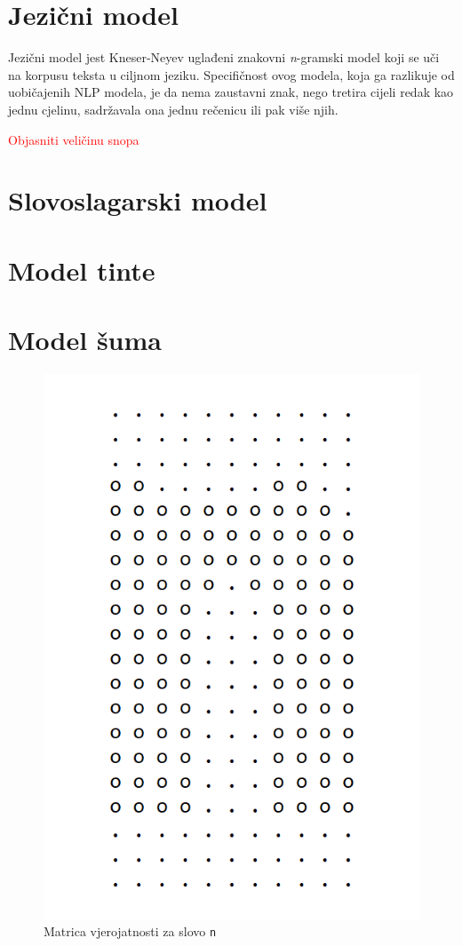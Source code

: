 \documentclass[zavrsnirad]{fer}
\begin{document}
\section{Jezični model}

Jezični model jest Kneser-Neyev uglađeni znakovni \textit{n}-gramski model \cite{Kneser1995} koji se uči na korpusu teksta u ciljnom jeziku. Specifičnost ovog modela, koja ga razlikuje od uobičajenih NLP modela, je da nema zaustavni znak, nego tretira cijeli redak kao jednu cjelinu, sadržavala ona jednu rečenicu ili pak više njih.

\textcolor{red}{Objasniti veličinu snopa} \cite{Berg2014}


\section{Slovoslagarski model}



\section{Model tinte}



\section{Model šuma}



\begin{figure}[hbt]
	\centering
	\includegraphics[width=0.35\linewidth]{Figures/letter-matrix.png} 
	\caption{Matrica vjerojatnosti za slovo \texttt{n}}
	\label{slk:matrica}
\end{figure}







\end{document}
